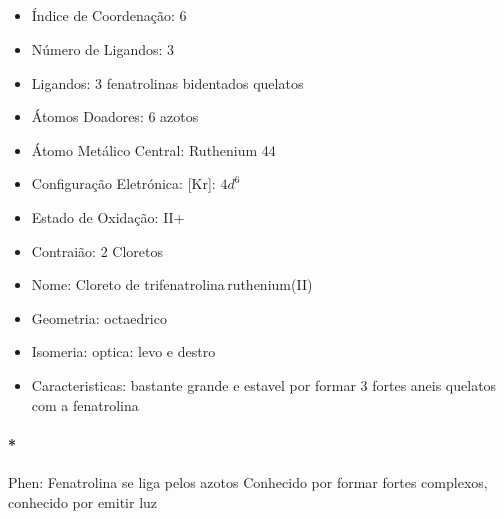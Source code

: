 \documentclass[12pt]{article}
\begin{document}
\noindent\begin{minipage}{\textwidth}
	
	\subsection{}
	\begin{itemize}
   
   \item Índice de Coordenação:
   	6
   
   \item Número de Ligandos:
   	3
   
   \item Ligandos:
   	3 fenatrolinas bidentados quelatos
   
   \item Átomos Doadores:
   	6 azotos
   
   \item Átomo Metálico Central:
   	Ruthenium 44
   
   \item Configuração Eletrónica:
   	[Kr]: $4d^6$
   
   \item Estado de Oxidação:
   	II+
   
   \item Contraião:
   	2 Cloretos 
   
   \item Nome:
   	Cloreto de trifenatrolina\,ruthenium(II)
   
   \item Geometria:
   	octaedrico
   
   \item Isomeria:
		optica: levo e destro

	\item Caracteristicas:
		bastante grande e estavel por formar 3 fortes aneis quelatos com a fenatrolina

	\end{itemize}
	
\end{minipage}

\paragraph{*}
Phen: Fenatrolina  se liga pelos azotos Conhecido por formar fortes complexos, conhecido por emitir luz
\end{document}
